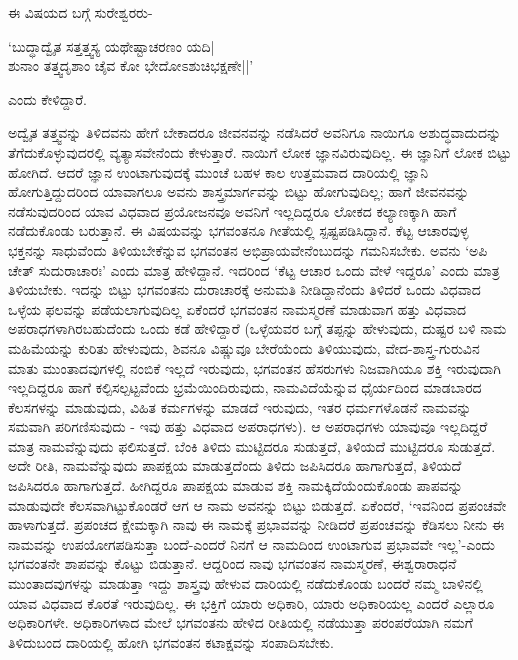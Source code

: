 ಈ ವಿಷಯದ ಬಗ್ಗೆ ಸುರೇಶ್ವರರು-

\begin{shloka}
`ಬುದ್ಧಾದ್ವೈತ ಸತ್ತತ್ತ್ವಸ್ಯ ಯಥೇಷ್ಟಾಚರಣಂ ಯದಿ|\\
ಶುನಾಂ ತತ್ತ್ವದೃಶಾಂ ಚೈವ ಕೋ ಭೇದೋಽಶುಚಿಭಕ್ಷಣೇ||'
\end{shloka}

ಎಂದು ಕೇಳಿದ್ದಾರೆ.

ಅದ್ವೈತ ತತ್ತ್ವವನ್ನು ತಿಳಿದವನು ಹೇಗೆ ಬೇಕಾದರೂ ಜೀವನವನ್ನು ನಡೆಸಿದರೆ ಅವನಿಗೂ ನಾಯಿಗೂ ಅಶುದ್ಧವಾದುದನ್ನು ತೆಗೆದುಕೊಳ್ಳುವುದರಲ್ಲಿ ವ್ಯತ್ಯಾಸವೇನೆಂದು ಕೇಳುತ್ತಾರೆ. ನಾಯಿಗೆ ಲೋಕ ಜ್ಞಾನವಿರುವುದಿಲ್ಲ. ಈ ಜ್ಞಾನಿಗೆ ಲೋಕ ಬಿಟ್ಟು ಹೋಗಿದೆ. ಆದರೆ ಜ್ಞಾನ ಉಂಟಾಗುವುದಕ್ಕೆ ಮುಂಚೆ ಬಹಳ ಕಾಲ ಉತ್ತಮವಾದ ದಾರಿಯಲ್ಲಿ ಜ್ಞಾನಿ ಹೋಗುತ್ತಿದ್ದುದರಿಂದ ಯಾವಾಗಲೂ ಅವನು ಶಾಸ್ತ್ರಮಾರ್ಗವನ್ನು ಬಿಟ್ಟು ಹೋಗುವುದಿಲ್ಲ; ಹಾಗೆ ಜೀವನವನ್ನು ನಡೆಸುವುದರಿಂದ ಯಾವ ವಿಧವಾದ ಪ್ರಯೋಜನವೂ ಅವನಿಗೆ ಇಲ್ಲದಿದ್ದರೂ ಲೋಕದ ಕಲ್ಯಾಣಕ್ಕಾಗಿ ಹಾಗೆ ನಡೆದುಕೊಂಡು ಬರುತ್ತಾನೆ. ಈ ವಿಷಯವನ್ನು ಭಗವಂತನೂ ಗೀತೆಯಲ್ಲಿ ಸ್ಪಷ್ಟಪಡಿಸಿದ್ದಾನೆ. ಕೆಟ್ಟ ಆಚಾರವುಳ್ಳ ಭಕ್ತನನ್ನು ಸಾಧುವೆಂದು ತಿಳಿಯಬೇಕೆನ್ನುವ ಭಗವಂತನ ಅಭಿಪ್ರಾಯವೇನೆಂಬುದನ್ನು ಗಮನಿಸಬೇಕು. ಅವನು `ಅಪಿ ಚೇತ್ ಸುದುರಾಚಾರಃ' ಎಂದು ಮಾತ್ರ ಹೇಳಿದ್ದಾನೆ. ಇದರಿಂದ `ಕೆಟ್ಟ ಆಚಾರ ಒಂದು ವೇಳೆ ಇದ್ದರೂ' ಎಂದು ಮಾತ್ರ ತಿಳಿಯಬೇಕು. ಇದನ್ನು ಬಿಟ್ಟು ಭಗವಂತನು ದುರಾಚಾರಕ್ಕೆ ಅನುಮತಿ ನೀಡಿದ್ದಾನೆಂದು ತಿಳಿದರೆ ಒಂದು ವಿಧವಾದ ಒಳ್ಳೆಯ ಫಲವನ್ನು ಪಡೆಯಲಾಗುವುದಿಲ್ಲ ಏಕೆಂದರೆ ಭಗವಂತನ ನಾಮಸ್ಮರಣೆ ಮಾಡುವಾಗ ಹತ್ತು ವಿಧವಾದ ಅಪರಾಧಗಳಾಗಿರಬಹುದೆಂದು ಒಂದು ಕಡೆ ಹೇಳಿದ್ದಾರೆ (ಒಳ್ಳೆಯವರ ಬಗ್ಗೆ ತಪ್ಪನ್ನು ಹೇಳುವುದು, ದುಷ್ಟರ ಬಳಿ ನಾಮ ಮಹಿಮೆಯನ್ನು ಕುರಿತು ಹೇಳುವುದು, ಶಿವನೂ ವಿಷ್ಣುವೂ ಬೇರೆಯೆಂದು ತಿಳಿಯುವುದು, ವೇದ-ಶಾಸ್ತ್ರ-ಗುರುವಿನ ಮಾತು ಮುಂತಾದವುಗಳಲ್ಲಿ ನಂಬಿಕೆ ಇಲ್ಲದೆ ಇರುವುದು, ಭಗವಂತನ ಹೆಸರುಗಳು ನಿಜವಾಗಿಯೂ ಶಕ್ತಿ ಇರುವುದಾಗಿ ಇಲ್ಲದಿದ್ದರೂ ಹಾಗೆ ಕಲ್ಪಿಸಲ್ಪಟ್ಟವೆಂದು ಭ್ರಮೆಯಿಂದಿರುವುದು, ನಾಮವಿದೆಯೆನ್ನುವ ಧೈರ್ಯದಿಂದ ಮಾಡಬಾರದ ಕೆಲಸಗಳನ್ನು ಮಾಡುವುದು, ವಿಹಿತ ಕರ್ಮಗಳನ್ನು ಮಾಡದೆ ಇರುವುದು, ಇತರ ಧರ್ಮಗಳೊಡನೆ ನಾಮವನ್ನು ಸಮವಾಗಿ ಪರಿಗಣಿಸುವುದು - ಇವು ಹತ್ತು ವಿಧವಾದ ಅಪರಾಧಗಳು). ಆ ಅಪರಾಧಗಳು ಯಾವುವೂ ಇಲ್ಲದಿದ್ದರೆ ಮಾತ್ರ ನಾಮವೆನ್ನುವುದು ಫಲಿಸುತ್ತದೆ. ಬೆಂಕಿ ತಿಳಿದು ಮುಟ್ಟಿದರೂ ಸುಡುತ್ತದೆ, ತಿಳಿಯದೆ ಮುಟ್ಟಿದರೂ ಸುಡುತ್ತದೆ. ಅದೇ ರೀತಿ, ನಾಮವೆನ್ನುವುದು ಪಾಪಕ್ಷಯ ಮಾಡುತ್ತದೆಂದು ತಿಳಿದು ಜಪಿಸಿದರೂ ಹಾಗಾಗುತ್ತದೆ, ತಿಳಿಯದೆ ಜಪಿಸಿದರೂ ಹಾಗಾಗುತ್ತದೆ. ಹೀಗಿದ್ದರೂ ಪಾಪಕ್ಷಯ ಮಾಡುವ ಶಕ್ತಿ ನಾಮಕ್ಕಿದೆಯೆಂದುಕೊಂಡು ಪಾಪವನ್ನು ಮಾಡುವುದೇ ಕೆಲಸವಾಗಿಟ್ಟುಕೊಂಡರೆ ಆಗ ಆ ನಾಮ ಅವನನ್ನು ಬಿಟ್ಟು ಬಿಡುತ್ತದೆ. ಏಕೆಂದರೆ, `ಇವನಿಂದ ಪ್ರಪಂಚವೇ ಹಾಳಾಗುತ್ತದೆ. ಪ್ರಪಂಚದ ಕ್ಷೇಮಕ್ಕಾಗಿ ನಾವು ಈ ನಾಮಕ್ಕೆ ಪ್ರಭಾವವನ್ನು ನೀಡಿದರೆ ಪ್ರಪಂಚವನ್ನು ಕೆಡಿಸಲು ನೀನು ಈ ನಾಮವನ್ನು ಉಪಯೋಗಪಡಿಸುತ್ತಾ ಬಂದೆ-ಎಂದರೆ ನಿನಗೆ ಆ ನಾಮದಿಂದ ಉಂಟಾಗುವ ಪ್ರಭಾವವೇ ಇಲ್ಲ'-ಎಂದು ಭಗವಂತನೇ ಶಾಪವನ್ನು ಕೊಟ್ಟು ಬಿಡುತ್ತಾನೆ. ಆದ್ದರಿಂದ ನಾವು ಭಗವಂತನ ನಾಮಸ್ಮರಣೆ, ಈಶ್ವರಾರಾಧನೆ ಮುಂತಾದವುಗಳನ್ನು ಮಾಡುತ್ತಾ ಇದ್ದು ಶಾಸ್ತ್ರವು ಹೇಳುವ ದಾರಿಯಲ್ಲಿ ನಡೆದುಕೊಂಡು ಬಂದರೆ ನಮ್ಮ ಬಾಳಿನಲ್ಲಿ ಯಾವ ವಿಧವಾದ ಕೊರತೆ ಇರುವುದಿಲ್ಲ. ಈ ಭಕ್ತಿಗೆ ಯಾರು ಅಧಿಕಾರಿ, ಯಾರು ಅಧಿಕಾರಿಯಲ್ಲ ಎಂದರೆ ಎಲ್ಲಾರೂ ಅಧಿಕಾರಿಗಳೇ. ಅಧಿಕಾರಿಗಳಾದ ಮೇಲೆ ಭಗವಂತನು ಹೇಳಿದ ರೀತಿಯಲ್ಲಿ ನಡೆಯುತ್ತಾ ಪರಂಪರೆಯಾಗಿ ನಮಗೆ ತಿಳಿದುಬಂದ ದಾರಿಯಲ್ಲಿ ಹೋಗಿ ಭಗವಂತನ ಕಟಾಕ್ಷವನ್ನು ಸಂಪಾದಿಸಬೇಕು.

